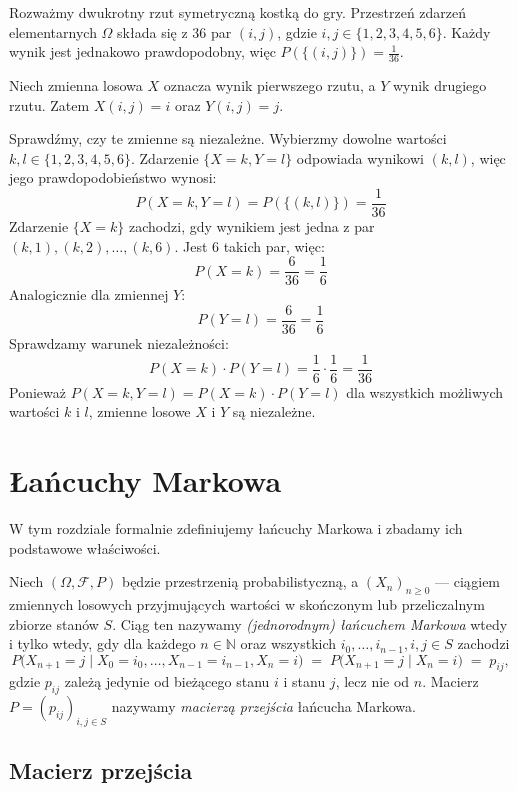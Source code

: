 \documentclass[final,a4paper,openany,12pt]{mwbk}
\begin{document}
\begin{Prz}
    Rozważmy dwukrotny rzut symetryczną kostką do gry. Przestrzeń zdarzeń elementarnych $\Omega$ składa się z 36 par $(i, j)$, gdzie $i, j \in \{1, 2, 3, 4, 5, 6\}$. Każdy wynik jest jednakowo prawdopodobny, więc $P(\{(i,j)\}) = \frac{1}{36}$.

Niech zmienna losowa $X$ oznacza wynik pierwszego rzutu, a $Y$ wynik drugiego rzutu. Zatem $X(i,j) = i$ oraz $Y(i,j) = j$.

Sprawdźmy, czy te zmienne są niezależne. Wybierzmy dowolne wartości $k, l \in \{1, 2, 3, 4, 5, 6\}$.
Zdarzenie $\{X=k, Y=l\}$ odpowiada wynikowi $(k,l)$, więc jego prawdopodobieństwo wynosi:
$$
P(X=k, Y=l) = P(\{(k,l)\}) = \frac{1}{36}
$$
Zdarzenie $\{X=k\}$ zachodzi, gdy wynikiem jest jedna z par $(k,1), (k,2), \dots, (k,6)$. Jest 6 takich par, więc:
$$
P(X=k) = \frac{6}{36} = \frac{1}{6}
$$
Analogicznie dla zmiennej $Y$:
$$
P(Y=l) = \frac{6}{36} = \frac{1}{6}
$$
Sprawdzamy warunek niezależności:
$$
P(X=k) \cdot P(Y=l) = \frac{1}{6} \cdot \frac{1}{6} = \frac{1}{36}
$$
Ponieważ $P(X=k, Y=l) = P(X=k) \cdot P(Y=l)$ dla wszystkich możliwych wartości $k$ i $l$, zmienne losowe $X$ i $Y$ są niezależne.
\end{Prz}

\chapter{Łańcuchy Markowa}

W tym rozdziale formalnie zdefiniujemy łańcuchy Markowa i zbadamy ich podstawowe właściwości.


\begin{Def}
Niech $(\Omega,\mathcal F, P)$ będzie przestrzenią probabilistyczną, a 
$(X_n)_{n\ge 0}$ — ciągiem zmiennych losowych przyjmujących wartości w skończonym
lub przeliczalnym zbiorze stanów $S$.  
Ciąg ten nazywamy \emph{(jednorodnym) łańcuchem Markowa} wtedy i tylko wtedy, gdy
dla każdego $n\in\mathbb N$ oraz wszystkich $i_0,\ldots,i_{n-1},i,j\in S$ zachodzi
\[
  P\!\bigl(X_{n+1}=j \;\big|\;
      X_0=i_0,\ldots,X_{n-1}=i_{n-1},X_n=i\bigr)
    \;=\;
  P\!\bigl(X_{n+1}=j \mid X_n=i\bigr)
    \;=\; p_{ij},
\]
gdzie $p_{ij}$ zależą jedynie od bieżącego stanu $i$ i stanu $j$, lecz nie od $n$.
Macierz $P=(p_{ij})_{i,j\in S}$ nazywamy \emph{macierzą przejścia} łańcucha Markowa.
\end{Def}

\section{Macierz przejścia}
\end{document}
